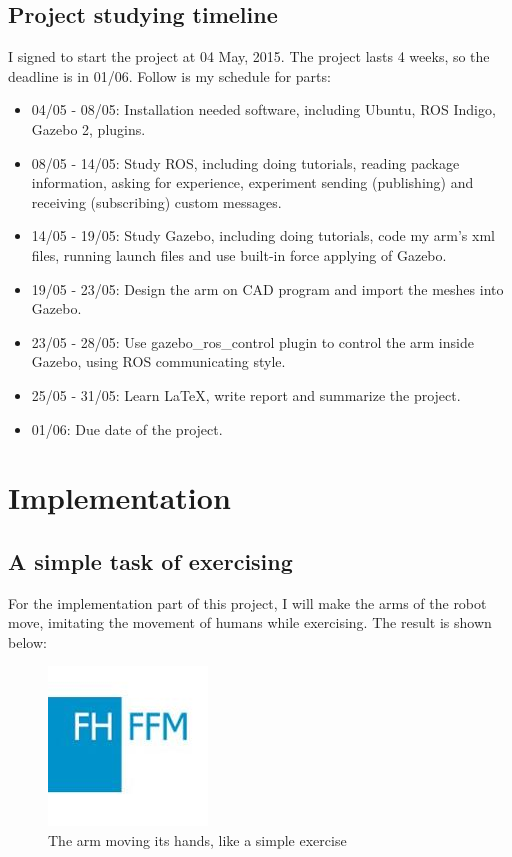 \documentclass[pdftex,12pt,a4paper]{article}
\begin{document}
  \subsection{Project studying timeline}
  I signed to start the project at 04 May, 2015. The project lasts 4 weeks, so the deadline is in 01/06. Follow is my schedule for parts:
  \begin{itemize}
  \item 04/05 - 08/05: Installation needed software, including Ubuntu, ROS Indigo, Gazebo 2, plugins.
  \item 08/05 - 14/05: Study ROS, including doing tutorials, reading package information, asking for experience, experiment sending (publishing) and receiving (subscribing) custom messages.
  \item 14/05 - 19/05: Study Gazebo, including doing tutorials, code my arm's xml files, running launch files and use built-in force applying of Gazebo.
  \item 19/05 - 23/05: Design the arm on CAD program and import the meshes into Gazebo.
  \item 23/05 - 28/05: Use gazebo\_ros\_control plugin to control the arm inside Gazebo, using ROS communicating style.
  \item 25/05 - 31/05: Learn LaTeX, write report and summarize the project.
  \item 01/06: Due date of the project.
  \end{itemize}
  
  \newpage
  \section{Implementation}
  \subsection{A simple task of exercising}
  For the implementation part of this project, I will make the arms of the robot move, imitating the movement of humans while exercising. The result is shown below:
  \begin{figure}[h]
      \centering
      \includegraphics[width=0.6\linewidth]{image/FH-Frankfurt.jpg}
      \caption{The arm moving its hands, like a simple exercise}
      \label{fig:arm_exercise}
  \end{figure}
    
\end{document}
